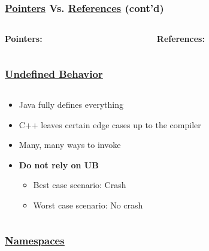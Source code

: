 \documentclass[glossy]{beamer}
\newcommand{\cppref}[2]{\href{http://en.cppreference.com/w/cpp/#1}{\underline{#2}}}
\newcommand{\refer}[1]{([shift={(.25em,.25em)}]pic cs:#1)}
\begin{document}
\begin{frame}[fragile=singleslide]
  \frametitle{\cppref{language/pointer}{Pointers} Vs. \cppref{language/reference}{References} (cont'd)}
  \begin{columns}[t]
    \begin{column}{6cm}
      \textbf{Pointers:}
    \end{column}

    \begin{column}{6cm}
      \textbf{References:}
    \end{column}
  \end{columns}
\end{frame}


\begin{frame}[fragile=singleslide]
  \frametitle{\cppref{language/ub}{Undefined Behavior}}
  \begin{columns}
    \begin{column}{6cm}
      \begin{itemize}
        \item Java fully defines everything
        \item C++ leaves certain edge cases up to the compiler
        \item Many, many ways to invoke
        \item \textbf{Do not rely on UB}
        \begin{itemize}
          \item Best case scenario: Crash
          \item Worst case scenario: No crash
        \end{itemize}
      \end{itemize}
    \end{column}

    \begin{column}{6cm}
    \end{column}
  \end{columns}
\end{frame}


\begin{frame}[fragile=singleslide]
  \frametitle{\cppref{language/namespace}{Namespaces}}


\end{frame}
\end{document}

